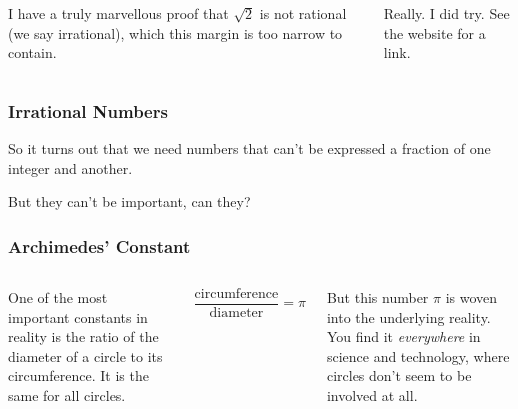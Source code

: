 \documentclass{beamer}
\begin{document}
\begin{frame}

  \begin{columns}

  \column{4 cm}

	
	\column{4 cm}
	
	\pause
	I have a truly marvellous proof that $\sqrt{2}$ is not rational (we say irrational), which this margin is too narrow to contain.
	
	\medskip
	
	\pause
	Really. I did try. See the website for a link.
		
	\end{columns}
\end{frame}


{
\begin{frame}
  \frametitle{Irrational Numbers}
  So it turns out that we need numbers that can’t be expressed a fraction of one integer and another.
  \medskip
  \pause

But they can’t be important, can they?
\end{frame}
} %

\begin{frame}
  \frametitle{Archimedes' Constant}
  
  \begin{columns}
  
  \column{6 cm}
  
  One of the most important constants in \alert{reality} is the ratio of the diameter of a circle to its circumference. It is the same for all circles.
  
\[
\frac{\textrm{circumference}}{\textrm{diameter}} = \pi 
\]

\medskip
But this number $\pi$ is woven into the underlying reality. You find it \emph{everywhere} in science and technology, where circles don't seem to be involved at all.
  
  \column{5 cm}
  
  \end{columns}
\end{frame}
\end{document}
